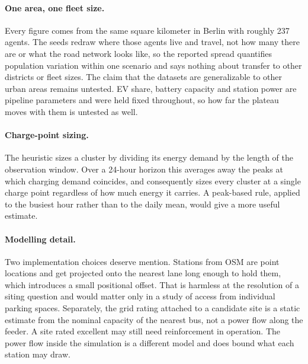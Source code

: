 \paragraph{One area, one fleet size.} Every figure comes from the same square kilometer in Berlin with roughly 237 agents. The seeds redraw where those agents live and travel, not how many there are or what the road network looks like, so the reported spread quantifies population variation within one scenario and says nothing about transfer to other districts or fleet sizes. The claim that the datasets are generalizable to other urban areas remains untested. \ac{EV} share, battery capacity and station power are pipeline parameters and were held fixed throughout, so how far the plateau moves with them is untested as well.

\paragraph{Charge-point sizing.} The heuristic sizes a cluster by dividing its energy demand by the length of the observation window. Over a 24-hour horizon this averages away the peaks at which charging demand coincides, and consequently sizes every cluster at a single charge point regardless of how much energy it carries. A peak-based rule, applied to the busiest hour rather than to the daily mean, would give a more useful estimate.

\paragraph{Modelling detail.} Two implementation choices deserve mention. Stations from \ac{OSM} are point locations and get projected onto the nearest lane long enough to hold them, which introduces a small positional offset. That is harmless at the resolution of a siting question and would matter only in a study of access from individual parking spaces. Separately, the grid rating attached to a candidate site is a static estimate from the nominal capacity of the nearest bus, not a power flow along the feeder. A site rated excellent may still need reinforcement in operation. The power flow inside the simulation is a different model and does bound what each station may draw.
